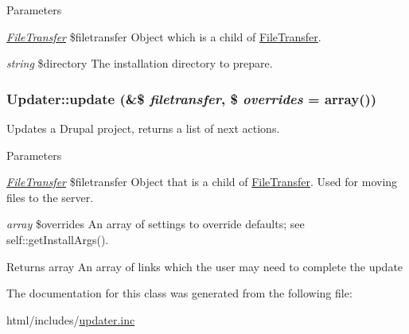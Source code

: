 \begin{DoxyParams}{Parameters}
\item[{\em \hyperlink{classFileTransfer}{FileTransfer}}]\$filetransfer Object which is a child of \hyperlink{classFileTransfer}{FileTransfer}. \item[{\em string}]\$directory The installation directory to prepare. \end{DoxyParams}
\hypertarget{classUpdater_a3129525aef507bdf5c3f8abf278b8e88}{
\subsubsection[{update}]{\setlength{\rightskip}{0pt plus 5cm}Updater::update (\&\$ {\em filetransfer}, \/  \$ {\em overrides} = {\ttfamily array()})}}
\label{classUpdater_a3129525aef507bdf5c3f8abf278b8e88}
Updates a Drupal project, returns a list of next actions.


\begin{DoxyParams}{Parameters}
\item[{\em \hyperlink{classFileTransfer}{FileTransfer}}]\$filetransfer Object that is a child of \hyperlink{classFileTransfer}{FileTransfer}. Used for moving files to the server. \item[{\em array}]\$overrides An array of settings to override defaults; see self::getInstallArgs().\end{DoxyParams}
\begin{DoxyReturn}{Returns}
array An array of links which the user may need to complete the update 
\end{DoxyReturn}


The documentation for this class was generated from the following file:\begin{DoxyCompactItemize}
\item 
html/includes/\hyperlink{updater_8inc}{updater.inc}\end{DoxyCompactItemize}
